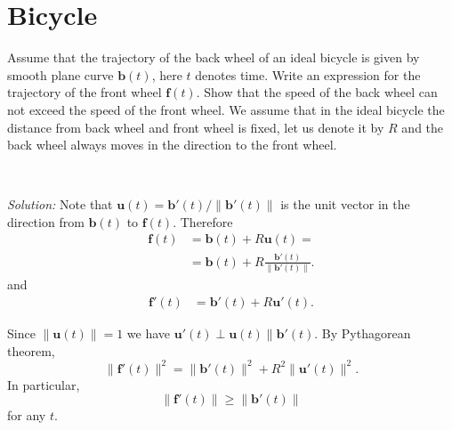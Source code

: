 \documentclass{article}
\def\ge{\geqslant}%
\begin{document}
\section*{
Bicycle
}

Assume that the trajectory of the back wheel of an ideal bicycle is given by smooth plane curve $\mathbf{b}(t)$, here $t$ denotes time. Write an expression for the trajectory of the front wheel $\mathbf{f}(t)$. 
Show that the speed of the back wheel can not exceed the speed of the front wheel.
We assume that in the ideal bicycle the distance from back wheel and front wheel is fixed, let us denote it by $R$ and the back wheel always moves in the direction to the front wheel.

\ 
  

\noindent\textit{Solution:} Note that $\mathbf{u}(t)=\mathbf{b}'(t)/\|\mathbf{b}'(t)\|$ is the unit vector in the direction from $\mathbf{b}(t)$ to $\mathbf{f}(t)$.
Therefore
\begin{align*}
\mathbf{f}(t)&=\mathbf{b}(t)+R\mathbf{u}(t)=
\\
&=\mathbf{b}(t)+R\frac{\mathbf{b}'(t)}{\|\mathbf{b}'(t)\|}.
\end{align*}
and 
\begin{align*}
\mathbf{f}'(t)&=\mathbf{b}'(t)+R\mathbf{u}'(t).
\end{align*}

Since $\|\mathbf{u}(t)\|=1$ we have $\mathbf{u}'(t)\perp\mathbf{u}(t)\parallel \mathbf{b}'(t)$. By Pythagorean theorem,
\[\|\mathbf{f}'(t)\|^2=\|\mathbf{b}'(t)\|^2+R^2\|\mathbf{u}'(t)\|^2.\]
In particular, 
\[\|\mathbf{f}'(t)\|\ge \|\mathbf{b}'(t)\|\]
for any $t$.
\end{document}
